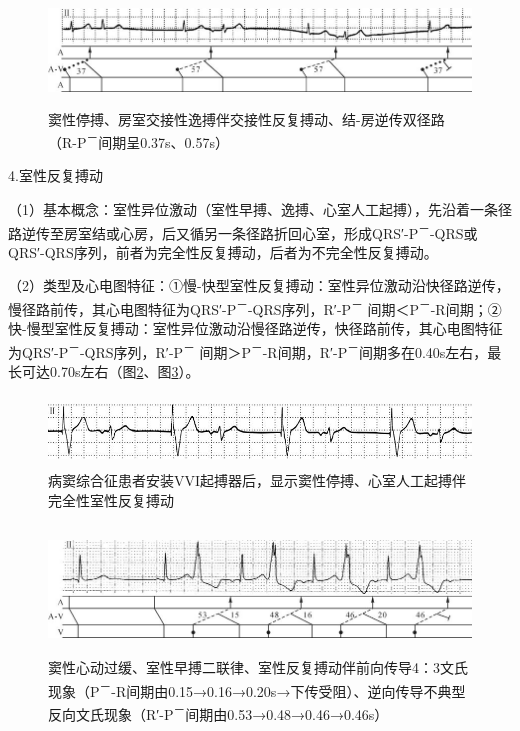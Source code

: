 \begin{figure}[!htbp]
 \centering
 \includegraphics[width=5.78125in,height=1.14583in]{./images/Image00254.jpg}
 \captionsetup{justification=centering}
 \caption{窦性停搏、房室交接性逸搏伴交接性反复搏动、结-房逆传双径路（R-P\textsuperscript{－}间期呈0.37s、0.57s）}
 \label{fig14-8}
  \end{figure} 


4.室性反复搏动

（1）基本概念：室性异位激动（室性早搏、逸搏、心室人工起搏），先沿着一条径路逆传至房室结或心房，后又循另一条径路折回心室，形成QRS′-P\textsuperscript{－}-QRS或QRS′-QRS序列，前者为完全性反复搏动，后者为不完全性反复搏动。

（2）类型及心电图特征：①慢-快型室性反复搏动：室性异位激动沿快径路逆传，慢径路前传，其心电图特征为QRS′-P\textsuperscript{－}-QRS序列，R′-P\textsuperscript{－} 间期＜P\textsuperscript{－}-R间期；②快-慢型室性反复搏动：室性异位激动沿慢径路逆传，快径路前传，其心电图特征为QRS′-P\textsuperscript{－}-QRS序列，R′-P\textsuperscript{－} 间期＞P\textsuperscript{－}-R间期，R′-P\textsuperscript{－}间期多在0.40s左右，最长可达0.70s左右（图\ref{fig14-9}、图\ref{fig14-10}）。

\begin{figure}[!htbp]
 \centering
 \includegraphics[width=5.58333in,height=0.73958in]{./images/Image00255.jpg}
 \captionsetup{justification=centering}
 \caption{病窦综合征患者安装VVI起搏器后，显示窦性停搏、心室人工起搏伴完全性室性反复搏动}
 \label{fig14-9}
  \end{figure} 

\begin{figure}[!htbp]
 \centering
 \includegraphics[width=5.78125in,height=1.34375in]{./images/Image00256.jpg}
 \captionsetup{justification=centering}
 \caption{窦性心动过缓、室性早搏二联律、室性反复搏动伴前向传导4：3文氏现象（P\textsuperscript{－}-R间期由0.15→0.16→0.20s→下传受阻）、逆向传导不典型反向文氏现象（R′-P\textsuperscript{－}间期由0.53→0.48→0.46→0.46s）}
 \label{fig14-10}
  \end{figure} 


